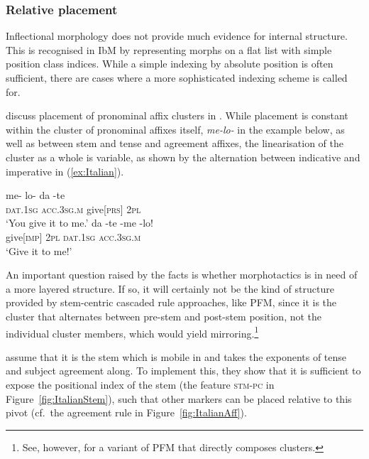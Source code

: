 \documentclass[output=paper
 	        ,biblatex
                ,babelshorthands
                ,newtxmath
                ,draftmode
                ,colorlinks, citecolor=brown
]{langscibook}
\begin{document}
\begin{exe}
\begin{xlist}
\begin{exe}
\begin{xlist}
\subsubsection*{Relative placement}

Inflectional morphology does not provide much evidence for internal
structure. This is recognised in IbM by representing morphs on a flat
list with simple position class indices. While a simple indexing by
absolute position is often sufficient, there are cases where a more
sophisticated indexing scheme is called
for.

\citet{Crysmann:Bonami:2016} discuss placement of pronominal affix
clusters in . While placement is constant within the cluster of
pronominal affixes
itself, \textit{me-lo-} in the example below, as well as
between stem and tense and agreement affixes, the linearisation of the
cluster as a whole is variable, as shown by the alternation between
indicative and imperative in (\ref{ex:Italian}).

\begin{exe}
  \ex\label{ex:Italian}
  \begin{xlist}
    \ex\gll me- lo- da -te\\
    \textsc{dat.1sg} \textsc{acc.3sg.m} give[\textsc{prs}] \textsc{2pl}\\
    \glt ‘You give it to me.’
    \ex\gll da -te -me -lo!\\
    give[\textsc{imp}] \textsc{2pl} \textsc{dat.1sg} \textsc{acc.3sg.m}\\
    \glt ‘Give it to me!’
  \end{xlist}
\end{exe}


An important question raised by the  facts is whether
morphotactics is in need of a more layered structure. If so, it will
certainly not be the kind of structure provided by stem-centric
cascaded rule approaches, like PFM, since it is the cluster that
alternates between pre-stem and post-stem position, not the individual
cluster members, which would yield mirroring.\footnote{See, however,
  \citet{Spencer05} for a variant of PFM that directly composes
  clusters.}

\citet{Crysmann:Bonami:2016} assume that it is the stem which is
mobile in  and takes the exponents of tense and subject
agreement along. To implement this, they show that it is sufficient to
expose the positional index of the stem (the feature \textsc{stm-pc}
in Figure~\ref{fig:ItalianStem}), such that other markers can
be placed relative to this pivot (cf.~the agreement rule in Figure~\ref{fig:ItalianAff}).  


\end{xlist}
\end{exe}
\end{xlist}
\end{exe}
\end{document}
